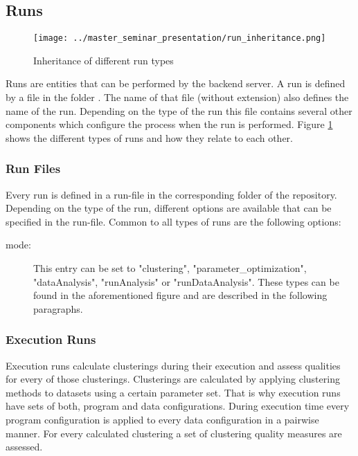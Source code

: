 	
	\subsection{Runs} \label{sec:runs}

\begin{figure}[hbtp]
\caption{Inheritance of different run types}
\label{fig_run_inheritance}
\centering
\texttt{[image: ../master\_seminar\_presentation/run\_inheritance.png]}
\end{figure} 
	
		Runs are entities that can be performed by the backend server. A run is defined by a file in the folder \highlight{\reporuns}. The name of that file (without extension) also defines the name of the run. Depending on the type of the run this file contains several other components which configure the process when the run is performed. Figure \ref{fig_run_inheritance} shows the different types of runs and how they relate to each other.
		
		\subsubsection{Run Files} \label{run_files}
		
		Every run is defined in a run-file in the corresponding folder of the repository. Depending on the type of the run, different options are available that can be specified in the run-file. Common to all types of runs are the following options:
		
		\begin{description}
			\item[mode:] \label{subsubsec:runconfigmode}
				This entry can be set to "clustering",  "parameter\_optimization", "dataAnalysis", "runAnalysis" or "runDataAnalysis". These types can be found in the aforementioned figure and are described in the following paragraphs.
		\end{description}
		
		\subsubsection{Execution Runs} \label{execution_runs}		
			Execution runs calculate clusterings during their execution and assess qualities for every of those clusterings. Clusterings are calculated by applying clustering methods to datasets using a certain parameter set. That is why execution runs have sets of both, program and data configurations. During execution time every program configuration is applied to every data configuration in a pairwise manner. For every calculated clustering a set of clustering quality measures are assessed.
			
